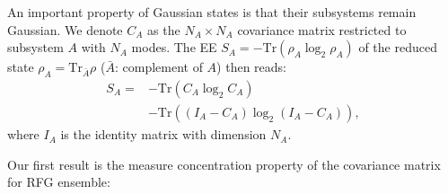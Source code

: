 \documentclass[twocolumn,english,prl,aps,superscriptaddress,amsmath,amssymb,floatfix]{revtex4-2}
\def \Tr {\mathrm{Tr}}
\begin{document}
An important property of Gaussian states is that their subsystems remain %
Gaussian. %
We denote $C_{A}$ as %
the $N_A\times N_A$ covariance matrix restricted
to %
subsystem $A$ with $N_A$ modes. The EE $S_A=-\Tr(\rho_A\log_2\rho_A)$ of the reduced state $\rho_A=\Tr_{\bar A}\rho$ ($\bar A$: complement of $A$) then reads:
\begin{equation}
\begin{split}
    S_{A}=&-\Tr(C_A\log_2 C_A)\\
    &-\Tr((I_A-C_A)\log_2 (I_A-C_A)), %
    \end{split}
    \label{eq:SA}
\end{equation}%
where $I_A$ is the identity matrix with dimension $N_A$.

Our first result is the measure concentration property of the covariance
matrix for RFG ensemble:
\end{document}
